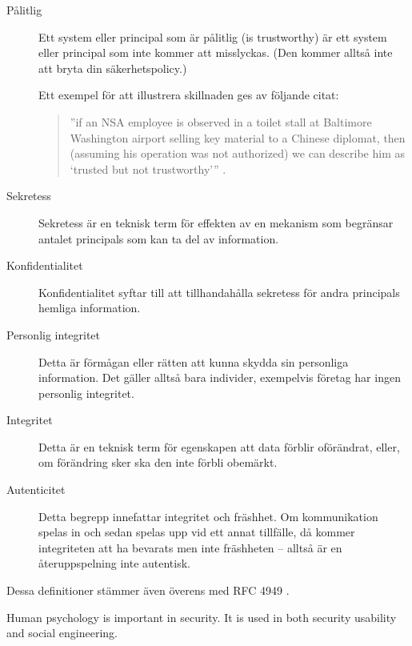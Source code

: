\documentclass[svv,addpoints]{miunexam}
\begin{document}
\begin{questions}
\begin{solution}
\begin{description}
      \item[Pålitlig] Ett system eller principal som är pålitlig 
        (\foreignlanguage{english}{is trustworthy}) är ett system eller 
        principal som inte kommer att misslyckas.
        (Den kommer alltså inte att bryta din säkerhetspolicy.)

        Ett exempel för att illustrera skillnaden ges av följande citat: 
        \begin{quote}
          \foreignlanguage{english}{
            ''if an NSA employee is observed in a toilet stall at Baltimore 
            Washington airport selling key material to a Chinese diplomat, then 
            (assuming his operation was not authorized) we can describe him as 
            `trusted but not trustworthy''' \cite[s.\  13]{Anderson2008sea}.
          }
        \end{quote}

      \item[Sekretess] Sekretess är en teknisk term för effekten av en mekanism 
        som begränsar antalet principals som kan ta del av information.

      \item[Konfidentialitet] Konfidentialitet syftar till att tillhandahålla 
        sekretess för andra principals hemliga information.

      \item[Personlig integritet] Detta är förmågan eller rätten att kunna 
        skydda sin personliga information.
        Det gäller alltså bara individer, exempelvis företag har ingen 
        personlig integritet.

      \item[Integritet] Detta är en teknisk term för egenskapen att data 
        förblir oförändrat, eller, om förändring sker ska den inte förbli 
        obemärkt.

      \item[Autenticitet] Detta begrepp innefattar integritet och fräshhet.
        Om kommunikation spelas in och sedan spelas upp vid ett annat 
        tillfälle, då kommer integriteten att ha bevarats men inte fräshheten 
        -- alltså är en återuppspelning inte autentisk.
    \end{description}
    Dessa definitioner stämmer även överens med RFC 4949 \cite{rfc4949}.
  \end{solution}


  \question\label{q:usability:E:C:A}
  Human psychology is important in security.
  It is used in both security usability and social engineering.
  \begin{parts}

\end{parts}
\end{questions}
\end{document}
